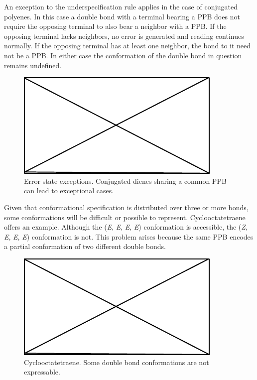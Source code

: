 \documentclass{article}
\begin{document}
An exception to the underspecification rule applies in the case of conjugated polyenes. In this case a double bond with a terminal bearing a PPB does not require the opposing terminal to also bear a neighbor with a PPB. If the opposing terminal lacks neighbors, no error is generated and reading continues normally. If the opposing terminal has at least one neighbor, the bond to it need not be a PPB. In either case the conformation of the double bond in question remains undefined.

\begin{figure}
    \centering
    \includegraphics{filler}
    \caption{Error state exceptions. Conjugated dienes sharing a common PPB can lead to exceptional cases.}
    \label{fig:bond-error-state-exceptions}
\end{figure}

Given that conformational specification is distributed over three or more bonds, some conformations will be difficult or possible to represent. Cyclooctatetraene offers an example. Although the (\textit{E}, \textit{E}, \textit{E}, \textit{E}) conformation is accessible, the (\textit{Z}, \textit{E}, \textit{E}, \textit{E}) conformation is not. This problem arises because the same PPB encodes a partial conformation of two different double bonds.

\begin{figure}
    \centering
    \includegraphics{filler}
    \caption{Cyclooctatetraene. Some double bond conformations are not expressable.}
    \label{fig:cyclooctatetraene}
\end{figure}
\end{document}
